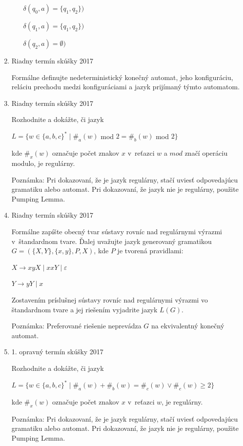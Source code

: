 \documentclass[11pt,a4paper]{article}
\begin{document}
\begin{enumerate}
\begin{itemize}
			$\delta(q_0, a) = \{q_1, q_2\})$

			$\delta(q_1, a) = \{q_1, q_2\})$

			$\delta(q_2, a) = \emptyset)$
		\end{itemize}

		\item Riadny termín skúšky 2017

		Formálne definujte nedeterministický konečný automat, jeho konfiguráciu, reláciu prechodu medzi konfiguráciami a jazyk prijímaný týmto automatom.

		\item Riadny termín skúšky 2017

		Rozhodnite a dokážte, či jazyk

		$L = \{w \in \{a,b,c\}^* \mid \#_a(w)$ mod $2 = \#_b(w)$ mod $2\}$

		kde $\#_x(w)$ označuje počet znakov $x$ v~reťazci $w$ a $mod$ značí operáciu modulo, je regulárny.

		Poznámka: Pri dokazovaní, že je jazyk regulárny, stačí uviesť odpovedajúcu gramatiku alebo automat. Pri dokazovaní, že jazyk nie je regulárny, použite Pumping Lemma.

		\item Riadny termín skúšky 2017

		Formálne zapíšte obecný tvar sústavy rovníc nad regulárnymi výrazmi v~štandardnom tvare. Ďalej uvažujte jazyk generovaný gramatikou $G = (\{X,Y\}, \{x,y\}, P, X)$, kde $P$ je tvorená pravidlami:

		$X \rightarrow xyX \mid xxY \mid \varepsilon$

		$Y \rightarrow yY \mid x$

		Zostavením príslušnej sústavy rovníc nad regulárnymi výrazmi vo štandardnom tvare a jej riešením vyjadrite jazyk $L(G)$.

		Poznámka: Preferované riešenie neprevádza $G$ na ekvivalentný konečný automat.

		\item 1. opravný termín skúšky 2017

		Rozhodnite a dokážte, či jazyk

		$L = \{w \in \{a,b,c\}^* \mid \#_a(w) + \#_b(w) =  \#_c(w) \lor \#_c(w) \geq 2\}$

		kde $\#_x(w)$ označuje počet znakov $x$ v~reťazci $w$, je regulárny.

		Poznámka: Pri dokazovaní, že je jazyk regulárny, stačí uviesť odpovedajúcu gramatiku alebo automat. Pri dokazovaní, že jazyk nie je regulárny, použite Pumping Lemma.


\end{enumerate}
\end{document}
